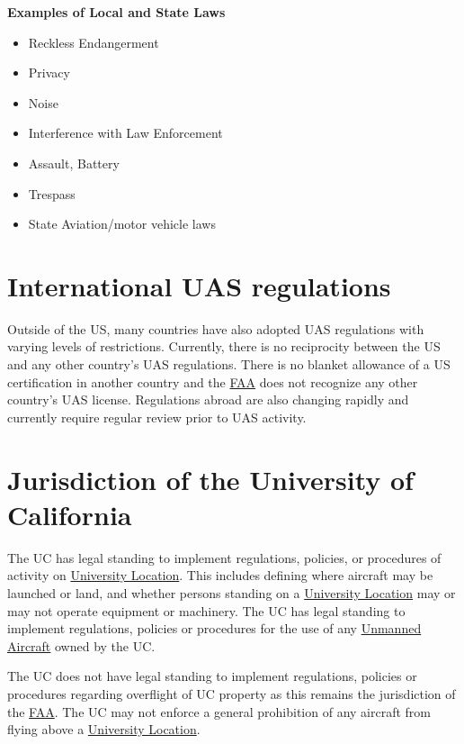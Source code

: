 \documentclass[
]{book}
\providecommand{\tightlist}{%
  \setlength{\itemsep}{0pt}\setlength{\parskip}{0pt}}
\begin{document}
\textbf{Examples of Local and State Laws}

\begin{itemize}
\tightlist
\item
  Reckless Endangerment
\item
  Privacy
\item
  Noise
\item
  Interference with Law Enforcement
\item
  Assault, Battery
\item
  Trespass
\item
  State Aviation/motor vehicle laws
\end{itemize}

\hypertarget{international-uas-regulations}{%
\section{International UAS regulations}\label{international-uas-regulations}}

Outside of the US, many countries have also adopted UAS regulations with varying levels of restrictions. Currently, there is no reciprocity between the US and any other country's UAS regulations. There is no blanket allowance of a US certification in another country and the \protect\hyperlink{FAA}{FAA} does not recognize any other country's UAS license. Regulations abroad are also changing rapidly and currently require regular review prior to UAS activity.

\hypertarget{jurisdiction-of-the-university-of-california}{%
\section{Jurisdiction of the University of California}\label{jurisdiction-of-the-university-of-california}}

The UC has legal standing to implement regulations, policies, or procedures of activity on \protect\hyperlink{UL}{University Location}. This includes defining where aircraft may be launched or land, and whether persons standing on a \protect\hyperlink{UL}{University Location} may or may not operate equipment or machinery. The UC has legal standing to implement regulations, policies or procedures for the use of any \protect\hyperlink{UA}{Unmanned Aircraft} owned by the UC.

The UC does not have legal standing to implement regulations, policies or procedures regarding overflight of UC property as this remains the jurisdiction of the \protect\hyperlink{FAA}{FAA}. The UC may not enforce a general prohibition of any aircraft from flying above a \protect\hyperlink{UL}{University Location}.
\end{document}
